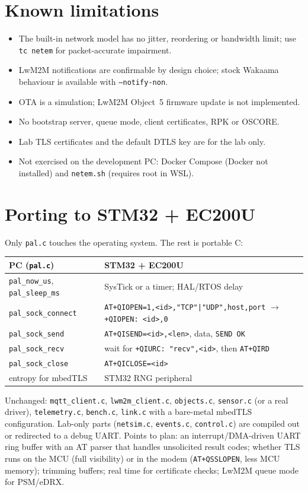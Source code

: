 \documentclass[11pt,a4paper]{article}
\newcommand{\code}[1]{\texttt{#1}}
\begin{document}
\section{Known limitations}
\begin{itemize}
  \item The built-in network model has no jitter, reordering or bandwidth
        limit; use \code{tc netem} for packet-accurate impairment.
  \item LwM2M notifications are confirmable by design choice; stock Wakaama
        behaviour is available with \code{--notify-non}.
  \item OTA is a simulation; LwM2M Object~5 firmware update is not implemented.
  \item No bootstrap server, queue mode, client certificates, RPK or OSCORE.
  \item Lab TLS certificates and the default DTLS key are for the lab only.
  \item Not exercised on the development PC: Docker Compose (Docker not
        installed) and \code{netem.sh} (requires root in WSL).
\end{itemize}

\section{Porting to STM32 + EC200U}\label{sec:port}
Only \code{pal.c} touches the operating system. The rest is portable C:
\begin{center}
\begin{tabularx}{\textwidth}{@{}lX@{}}
\toprule
PC (\code{pal.c}) & STM32 + EC200U \\
\midrule
\code{pal\_now\_us}, \code{pal\_sleep\_ms} & SysTick or a timer; HAL/RTOS delay \\
\code{pal\_sock\_connect} & \code{AT+QIOPEN=1,<id>,"TCP"|"UDP",host,port} $\rightarrow$ \code{+QIOPEN: <id>,0} \\
\code{pal\_sock\_send} & \code{AT+QISEND=<id>,<len>}, data, \code{SEND OK} \\
\code{pal\_sock\_recv} & wait for \code{+QIURC: "recv",<id>}, then \code{AT+QIRD} \\
\code{pal\_sock\_close} & \code{AT+QICLOSE=<id>} \\
entropy for mbedTLS & STM32 RNG peripheral \\
\bottomrule
\end{tabularx}
\end{center}
Unchanged: \code{mqtt\_client.c}, \code{lwm2m\_client.c}, \code{objects.c},
\code{sensor.c} (or a real driver), \code{telemetry.c}, \code{bench.c},
\code{link.c} with a bare-metal mbedTLS configuration. Lab-only parts
(\code{netsim.c}, \code{events.c}, \code{control.c}) are compiled out or
redirected to a debug UART. Points to plan: an interrupt/DMA-driven UART ring
buffer with an AT parser that handles unsolicited result codes; whether TLS
runs on the MCU (full visibility) or in the modem (\code{AT+QSSLOPEN}, less
MCU memory); trimming buffers; real time for certificate checks; LwM2M queue
mode for PSM/eDRX.
\end{document}
